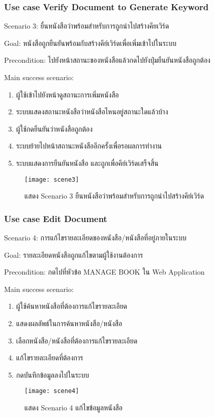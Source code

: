\subsubsection{Use case Verify Document to Generate Keyword}

Scenario 3: ยื่นหนังสือว่าพร้อมสำหรับการถูกนำไปสร้างคียเวิร์ด

Goal: หนังสือถูกยืนยันพร้อมกับสร้างคีย์เวิร์ดเพื่อเพิ่มเข้าไปในระบบ

Precondition: ไปยังหน้าสถานะของหนังสือแล้วกดไปยังปุ่มยืนยันหนังสือถูกต้อง

Main success scenario:

\begin{enumerate}
    \item ผู้ใช้เข้าไปยังหน้าดูสถานะการเพิ่มหนังสือ
    \item ระบบแสดงสถานะหนังสือว่าหนังสือไหนอยู่สถานะใดแล้วบ้าง
    \item ผู้ใช้กดยืนยันว่าหนังสือถูกต้อง
    \item ระบบย้ายไปหน้าสถานะหนังสืออีกครั้งเพื่อรอผลการทำงาน
    \item ระบบแสดงการยืนยันหนังสือ และถูกเพื่อคีย์เวิร์ดเสร็จสิ้น
\end{enumerate}
\begin{figure}[H]
    \centering
    \texttt{[image: scene3]}
    \caption{แสดง Scenario 3 ยืนหนังสือว่าพร้อมสำหรับการถูกนำไปสร้างคีย์เวิร์ด}\label{fig:scene3}
\end{figure}

\subsubsection{Use case Edit Document}

Scenario 4: การแก้ไขรายละเอียดของหนังสือ/หนังสือที่อยู่ภายในระบบ

Goal: รายละเอียดหนังสือถูกแก้ไขตามผู้ใช้งานต้องการ

Precondition: กดไปที่หัวข้อ MANAGE BOOK ใน Web Application

Main success scenario:

\begin{enumerate}
    \item ผู้ใช้ค้นหาหนังสือที่ต้องการแก้ไขรายละเอียด
    \item แสดงผลลัพธ์ในการค้นหาหนังสือ/หนังสือ
    \item เลือกหนังสือ/หนังสือที่ต้องการแก้ไขรายละเอียด
    \item แก้ไขรายละเอียดที่ต้องการ
    \item กดบันทึกข้อมูลลงไปในระบบ
\end{enumerate}
\begin{figure}[H]
    \centering
    \texttt{[image: scene4]}
    \caption{แสดง Scenario 4 แก้ไขข้อมูลหนังสือ}\label{fig:scene4}
\end{figure}

